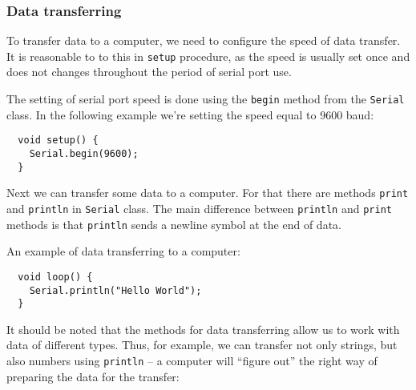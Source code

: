 \documentclass[../sparc.tex]{subfiles}
\begin{document}


\subsubsection{Data transferring}

To transfer data to a computer, we need to configure the speed of data transfer.
It is reasonable to to this in \texttt{setup} procedure, as the speed is usually
set once and does not changes throughout the period of serial port use.

The setting of serial port speed is done using the \texttt{begin} method from
the \texttt{Serial} class.  In the following example we're setting the speed
equal to 9600 baud:

\begin{verbatim}
  void setup() {
    Serial.begin(9600);
  }
\end{verbatim}

Next we can transfer some data to a computer.  For that there are methods
\texttt{print} and \texttt{println} in \texttt{Serial} class.  The main
difference between \texttt{println} and \texttt{print} methods is that
\texttt{println} sends a newline symbol at the end of data.


An example of data transferring to a computer:

\begin{verbatim}
  void loop() {
    Serial.println("Hello World");
  }
\end{verbatim}

It should be noted that the methods for data transferring allow us to work with
data of different types.  Thus, for example, we can transfer not only strings,
but also numbers using \texttt{println} -- a computer will ``figure out'' the
right way of preparing the data for the transfer:
\end{document}
